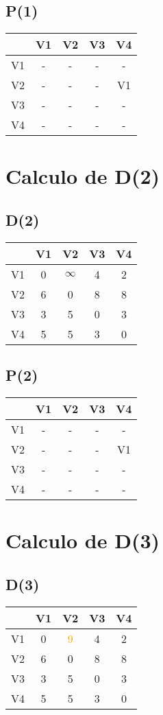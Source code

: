 \documentclass[a4paper,11pt]{article}
\begin{document}
\subsection*{P(1)}
\begin{center}
\begin{tabular}{c|cccc}
 & V1 & V2 & V3 & V4 \\ \hline
V1 & - & - & - & - \\
V2 & - & - & - & V1 \\
V3 & - & - & - & - \\
V4 & - & - & - & - \\
\end{tabular}
\end{center}
\newpage
\section*{Calculo de D(2)}
\subsection*{D(2)}
\begin{center}
\begin{tabular}{c|cccc}
 & V1 & V2 & V3 & V4 \\ \hline
V1 & 0 & $\infty$ & 4 & 2 \\
V2 & 6 & 0 & 8 & 8 \\
V3 & 3 & 5 & 0 & 3 \\
V4 & 5 & 5 & 3 & 0 \\
\end{tabular}
\end{center}
\subsection*{P(2)}
\begin{center}
\begin{tabular}{c|cccc}
 & V1 & V2 & V3 & V4 \\ \hline
V1 & - & - & - & - \\
V2 & - & - & - & V1 \\
V3 & - & - & - & - \\
V4 & - & - & - & - \\
\end{tabular}
\end{center}
\newpage
\section*{Calculo de D(3)}
\subsection*{D(3)}
\begin{center}
\begin{tabular}{c|cccc}
 & V1 & V2 & V3 & V4 \\ \hline
V1 & 0 & \textcolor{orange}{9} & 4 & 2 \\
V2 & 6 & 0 & 8 & 8 \\
V3 & 3 & 5 & 0 & 3 \\
V4 & 5 & 5 & 3 & 0 \\
\end{tabular}
\end{center}
\end{document}

